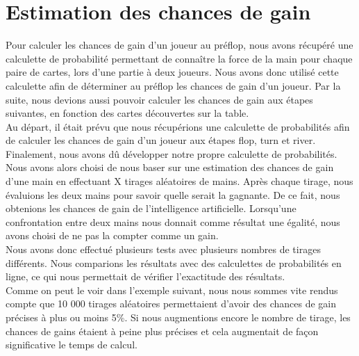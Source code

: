 \documentclass{report}
\begin{document}
\section{Estimation des chances de gain}

\hspace{0.5cm}Pour calculer les chances de gain d'un joueur au préflop, nous avons récupéré une calculette de probabilité permettant de connaître la force de la main pour chaque paire de cartes, lors d'une partie à deux joueurs. Nous avons donc utilisé cette calculette afin de déterminer au préflop les chances de gain d'un joueur. Par la suite, nous devions aussi pouvoir calculer les chances de gain aux étapes suivantes, en fonction des cartes découvertes sur la table.\\

Au départ, il était prévu que nous récupérions une calculette de probabilités afin de calculer les chances de gain d'un joueur aux étapes flop, turn et river. Finalement, nous avons dû développer notre propre calculette de probabilités.\\

Nous avons alors choisi de nous baser sur une estimation des chances de gain d'une main en effectuant X tirages aléatoires de mains. Après chaque tirage, nous évaluions les deux mains pour savoir quelle serait la gagnante. De ce fait, nous obtenions les chances de gain de l'intelligence artificielle. Lorsqu'une confrontation entre deux mains nous donnait comme résultat une égalité, nous avons choisi de ne pas la compter comme un gain.\\

Nous avons donc effectué plusieurs tests avec plusieurs nombres de tirages différents. Nous comparions les résultats avec des calculettes de probabilités en ligne, ce qui nous permettait de vérifier l'exactitude des résultats.\\

Comme on peut le voir dans l'exemple suivant, nous nous sommes vite rendus compte que 10 000 tirages aléatoires permettaient d'avoir des chances de gain précises à plus ou moins 5\%. Si nous augmentions encore le nombre de tirage, les chances de gains étaient à peine plus précises et cela augmentait de façon significative le temps de calcul. \\
\end{document}
